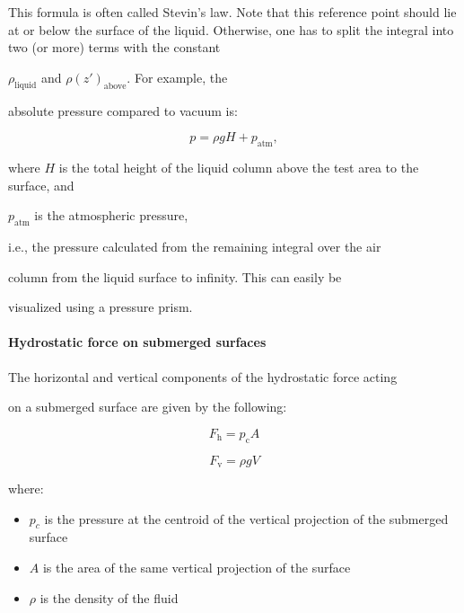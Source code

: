 This formula is often called Stevin's law. Note that this reference point should lie at or below the surface of the liquid. Otherwise, one has to split the integral into two (or more) terms with the constant

$\rho _\text{liquid}$ and $\rho (z') _\text{above}$. For example, the

absolute pressure compared to vacuum is:



$$p = \rho g H + p _\mathrm{atm},$$



where $H$ is the total height of the liquid column above the test area to the surface, and

$p _\text{atm}$ is the atmospheric pressure,

i.e., the pressure calculated from the remaining integral over the air

column from the liquid surface to infinity. This can easily be

visualized using a pressure prism.



\paragraph{Hydrostatic force on submerged surfaces}



The horizontal and vertical components of the hydrostatic force acting

on a submerged surface are given by the following:



$$F _\mathrm{h} = p _\mathrm{c}A$$

$$F _\mathrm{v} = \rho g V $$



where:



\begin{itemize}
    \item $p _c$ is the pressure at the centroid of the vertical projection of the submerged surface
\end{itemize}

\begin{itemize}
    \item $A$ is the area of the same vertical projection of the surface
\end{itemize}

\begin{itemize}
    \item $\rho$ is the density of the fluid
\end{itemize}

